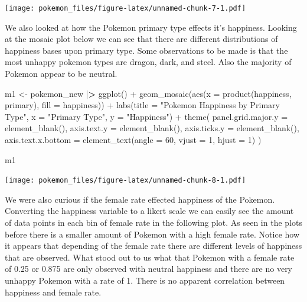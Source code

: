 \documentclass[
]{article}
\newenvironment{Shaded}{\begin{snugshade}}{\end{snugshade}}
\newcommand{\AttributeTok}[1]{\textcolor[rgb]{0.77,0.63,0.00}{#1}}
\newcommand{\DecValTok}[1]{\textcolor[rgb]{0.00,0.00,0.81}{#1}}
\newcommand{\ErrorTok}[1]{\textcolor[rgb]{0.64,0.00,0.00}{\textbf{#1}}}
\newcommand{\FunctionTok}[1]{\textcolor[rgb]{0.00,0.00,0.00}{#1}}
\newcommand{\NormalTok}[1]{#1}
\newcommand{\OtherTok}[1]{\textcolor[rgb]{0.56,0.35,0.01}{#1}}
\newcommand{\SpecialCharTok}[1]{\textcolor[rgb]{0.00,0.00,0.00}{#1}}
\newcommand{\StringTok}[1]{\textcolor[rgb]{0.31,0.60,0.02}{#1}}
\begin{document}
\texttt{[image: pokemon\_files/figure-latex/unnamed-chunk-7-1.pdf]}

We also looked at how the Pokemon primary type effects it's happiness.
Looking at the mosaic plot below we can see that there are different
distributions of happiness bases upon primary type. Some observations to
be made is that the most unhappy pokemon types are dragon, dark, and
steel. Also the majority of Pokemon appear to be neutral.

\begin{Shaded}
\begin{Highlighting}[]
\NormalTok{m1 }\OtherTok{\textless{}{-}}\NormalTok{ pokemon\_new }\SpecialCharTok{|}\ErrorTok{\textgreater{}} \FunctionTok{ggplot}\NormalTok{() }\SpecialCharTok{+}
  \FunctionTok{geom\_mosaic}\NormalTok{(}\FunctionTok{aes}\NormalTok{(}\AttributeTok{x =} \FunctionTok{product}\NormalTok{(happiness, primary), }\AttributeTok{fill =}\NormalTok{ happiness)) }\SpecialCharTok{+} 
  \FunctionTok{labs}\NormalTok{(}\AttributeTok{title =} \StringTok{"Pokemon Happiness by Primary Type"}\NormalTok{, }\AttributeTok{x =} \StringTok{"Primary Type"}\NormalTok{, }
       \AttributeTok{y =} \StringTok{"Happiness"}\NormalTok{) }\SpecialCharTok{+}
  \FunctionTok{theme}\NormalTok{(}
    \AttributeTok{panel.grid.major.y =} \FunctionTok{element\_blank}\NormalTok{(),}
    \AttributeTok{axis.text.y =} \FunctionTok{element\_blank}\NormalTok{(),}
    \AttributeTok{axis.ticks.y =} \FunctionTok{element\_blank}\NormalTok{(),}
    \AttributeTok{axis.text.x.bottom =} \FunctionTok{element\_text}\NormalTok{(}\AttributeTok{angle =} \DecValTok{60}\NormalTok{, }\AttributeTok{vjust =} \DecValTok{1}\NormalTok{, }\AttributeTok{hjust =} \DecValTok{1}\NormalTok{)}
\NormalTok{  )}

\NormalTok{m1}
\end{Highlighting}
\end{Shaded}

\texttt{[image: pokemon\_files/figure-latex/unnamed-chunk-8-1.pdf]}

We were also curious if the female rate effected happiness of the
Pokemon. Converting the happiness variable to a likert scale we can
easily see the amount of data points in each bin of female rate in the
following plot. As seen in the plots before there is a smaller amount of
Pokemon with a high female rate. Notice how it appears that depending of
the female rate there are different levels of happiness that are
observed. What stood out to us what that Pokemon with a female rate of
0.25 or 0.875 are only observed with neutral happiness and there are no
very unhappy Pokemon with a rate of 1. There is no apparent correlation
between happiness and female rate.
\end{document}
